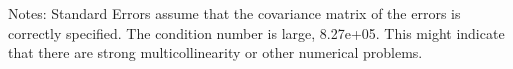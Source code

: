 Notes: \newline
 [1] Standard Errors assume that the covariance matrix of the errors is correctly specified. \newline
 [2] The condition number is large, 8.27e+05. This might indicate that there are \newline
 strong multicollinearity or other numerical problems.